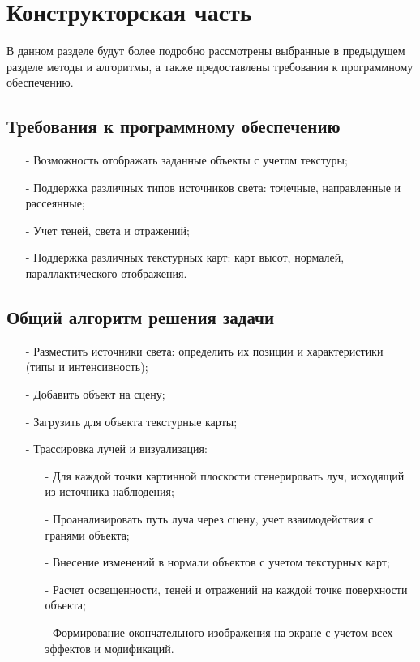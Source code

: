 \chapter{Конструкторская часть}

В данном разделе будут более подробно рассмотрены выбранные в предыдущем разделе методы и алгоритмы, а также предоставлены требования к программному обеспечению.

\section{Требования к программному обеспечению}
\begin{itemize}[label=\arabic*)]
	\item[-] Возможность отображать заданные объекты с учетом текстуры;
	\item[-] Поддержка различных типов источников света: точечные, направленные и рассеянные;
	\item[-] Учет теней, света и отражений;
	\item[-] Поддержка различных текстурных карт: карт высот, нормалей, параллактического отображения.
\end{itemize}

\section{Общий алгоритм решения задачи}
\begin{itemize}[label=\arabic*)]
	\item[-] Разместить источники света: определить их позиции и характеристики (типы и интенсивность);
	\item[-] Добавить объект на сцену;
	\item[-] Загрузить для объекта текстурные карты;
	\item[-] Трассировка лучей и визуализация:
	\begin{itemize}[label=\arabic*)]
		\item[-] Для каждой точки картинной плоскости сгенерировать луч, исходящий из источника наблюдения;
		\item[-] Проанализировать путь луча через сцену, учет взаимодействия с гранями объекта;
		\item[-] Внесение изменений в нормали объектов с учетом текстурных карт;
		\item[-] Расчет освещенности, теней и отражений на каждой точке поверхности объекта;
		\item[-] Формирование окончательного изображения на экране с учетом всех эффектов и модификаций.
	\end{itemize}
\end{itemize}

